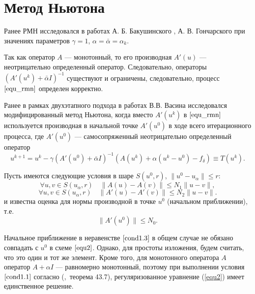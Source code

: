 \newpage
\section{Метод Ньютона}
Ранее РМН исследовался в работах А. Б. Бакушинского \cite{Bak1992}, А. В. Гончарского \cite{BakGon1989} при значениях параметров $\gamma=1$, $\alpha=\bar{\alpha}=\alpha_k$.

Так как оператор $A$ --- монотонный, то его производная $A'(u)$ --- неотрицательно определенный оператор. Следовательно, операторы $(A'(u^k)+\bar\alpha I)^{-1}$ существуют и ограничены, следовательно, процесс $\eqref{equ_rmn}$ определен корректно.

Ранее в рамках двухэтапного подхода в работах В.В. Васина \cite{VasAkiMin2013, Vasin2014} исследовался модифицированный метод Ньютона, когда вместо $A'(u^k)$ в $\eqref{equ_rmn}$ используется производная в начальной точке $A'(u^0)$ в ходе всего итерационного процесса, где $A'(u^0)$ --- самосопряженный неотрицательно определенный оператор  
$$
u^{k+1}=u^k-\gamma(A'(u^0)+\bar\alpha I)^{-1}(A(u^k)+\alpha(u^k-u^0)-f_\delta)\equiv{T(u^k)}.
$$

Пусть имеются следующие условия в шаре $S(u^0, r)$, $\|u^0-u_\alpha\| \le r$:
\begin{equation}\label{cond1.1}
\forall u, v \in S(u_\alpha, r) \quad \|A(u)-A(v)\|\le N_1\|u-v\|,
\end{equation}
\begin{equation}\label{cond1.2}
\forall u, v \in S(u_\alpha, r) \quad \|A'(u)-A'(v)\|\le N_2\|u-v\|.
\end{equation}
и известна оценка для нормы производной в точке $u^0$ (начальном приближении), т.е.
\begin{equation}\label{cond1.3}
\|A'(u^0)\| \le N_0.
\end{equation}
\begin{remark}
	Начальное приближение в неравенстве $\eqref{cond1.3}$ в общем случае не обязано совпадать с $u^0$ в схеме $\eqref{equ2}$. Однако, для простоты изложения, будем считать, что это один и тот же элемент. Кроме того, для монотонного оператора $A$ оператор $A+\alpha I$ --- равномерно монотонный, поэтому при выполнении условия $\ref{cond1.1}$ согласно (\cite{KufFuch1988},~теорема 43.7), регуляризованное уравнение (\ref{equ2}) имеет единственное решение.
\end{remark}

